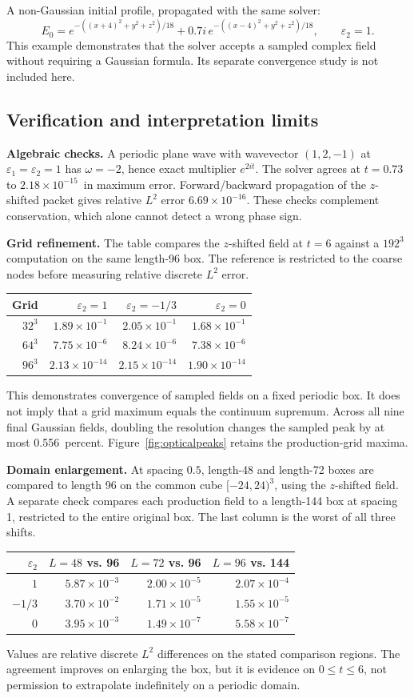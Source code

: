 \documentclass[10pt,letterpaper]{article}
\numberwithin{equation}{section}
\newcommand{\PlaneError}{$2.18\times10^{-15}$}
\newcommand{\ReverseError}{$6.69\times10^{-16}$}
\newcommand{\PeakPercent}{0.556}
\newcommand{\GridRows}{$32^3$ & $1.89\times10^{-1}$ & $2.05\times10^{-1}$ & $1.68\times10^{-1}$ \\
$64^3$ & $7.75\times10^{-6}$ & $8.24\times10^{-6}$ & $7.38\times10^{-6}$ \\
$96^3$ & $2.13\times10^{-14}$ & $2.15\times10^{-14}$ & $1.90\times10^{-14}$ \\}
\newcommand{\DomainRows}{$1$ & $5.87\times10^{-3}$ & $2.00\times10^{-5}$ & $2.07\times10^{-4}$ \\
$-1/3$ & $3.70\times10^{-2}$ & $1.71\times10^{-5}$ & $1.55\times10^{-5}$ \\
$0$ & $3.95\times10^{-3}$ & $1.49\times10^{-7}$ & $5.58\times10^{-7}$ \\}
\begin{document}
A non-Gaussian initial profile, propagated with the same solver:
\begin{equation}
 E_0=e^{-((x+4)^2+y^2+z^2)/18}
       +0.7i\,e^{-((x-4)^2+y^2+z^2)/18},\qquad \varepsilon_2=1.
\end{equation}
This example demonstrates that the solver accepts a sampled complex field without
requiring a Gaussian formula. Its separate convergence study is not included here.

\setlength{\parskip}{4pt}
\subsection{Verification and interpretation limits}\label{optical14}
\textbf{Algebraic checks.} A periodic plane wave with wavevector $(1,2,-1)$ at
$\varepsilon_1=\varepsilon_2=1$ has $\omega=-2$, hence exact multiplier $e^{2it}$.
The solver agrees at $t=0.73$ to \PlaneError\ in maximum error. Forward/backward
propagation of the $z$-shifted packet gives relative $L^2$ error \ReverseError.
These checks complement conservation, which alone cannot detect a wrong phase sign.

\textbf{Grid refinement.} The table compares the $z$-shifted field at $t=6$ against
a $192^3$ computation on the same length-96 box. The reference is restricted to
the coarse nodes before measuring relative discrete $L^2$ error.
\begin{center}\begin{tabular}{rrrr}\toprule
Grid & $\varepsilon_2=1$ & $\varepsilon_2=-1/3$ & $\varepsilon_2=0$ \\\midrule
\GridRows
\bottomrule\end{tabular}\end{center}
This demonstrates convergence of sampled fields on a fixed periodic box. It does
not imply that a grid maximum equals the continuum supremum. Across all nine final
Gaussian fields, doubling the resolution changes the sampled peak by at most
\PeakPercent\ percent. Figure~\ref{fig:opticalpeaks} retains the production-grid maxima.

\textbf{Domain enlargement.} At spacing $0.5$, length-48 and length-72 boxes are
compared to length 96 on the common cube $[-24,24)^3$, using the $z$-shifted field.
A separate check compares each production field to a length-144 box at spacing 1,
restricted to the entire original box. The last column is the worst of all three shifts.
\begin{center}\begin{tabular}{rrrr}\toprule
$\varepsilon_2$ & $L=48$ vs. 96 & $L=72$ vs. 96 & $L=96$ vs. 144 \\\midrule
\DomainRows
\bottomrule\end{tabular}\end{center}
Values are relative discrete $L^2$ differences on the stated comparison regions.
The agreement improves on enlarging the box, but it is evidence on $0\le t\le6$,
not permission to extrapolate indefinitely on a periodic domain.
\end{document}
